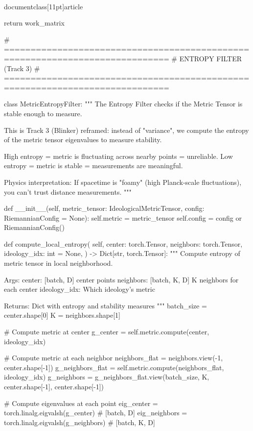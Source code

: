 \\documentclass[11pt]{article}
\begin{document}
\begin{CodeBlock}
        return work_matrix


# =============================================================================
# ENTROPY FILTER (Track 3)
# =============================================================================

class MetricEntropyFilter:
    """
    The Entropy Filter checks if the Metric Tensor is stable enough to measure.

    This is Track 3 (Blinker) reframed: instead of "variance", we compute
    the entropy of the metric tensor eigenvalues to measure stability.

    High entropy = metric is fluctuating across nearby points = unreliable.
    Low entropy = metric is stable = measurements are meaningful.

    Physics interpretation: If spacetime is "foamy" (high Planck-scale
    fluctuations), you can't trust distance measurements.
    """

    def __init__(self, metric_tensor: IdeologicalMetricTensor, config: RiemannianConfig = None):
        self.metric = metric_tensor
        self.config = config or RiemannianConfig()

    def compute_local_entropy(
        self,
        center: torch.Tensor,
        neighbors: torch.Tensor,
        ideology_idx: int = None,
    ) -> Dict[str, torch.Tensor]:
        """
        Compute entropy of metric tensor in local neighborhood.

        Args:
            center: [batch, D] center points
            neighbors: [batch, K, D] K neighbors for each center
            ideology_idx: Which ideology's metric

        Returns:
            Dict with entropy and stability measures
        """
        batch_size = center.shape[0]
        K = neighbors.shape[1]

        # Compute metric at center
        g_center = self.metric.compute(center, ideology_idx)

        # Compute metric at each neighbor
        neighbors_flat = neighbors.view(-1, center.shape[-1])
        g_neighbors_flat = self.metric.compute(neighbors_flat, ideology_idx)
        g_neighbors = g_neighbors_flat.view(batch_size, K, center.shape[-1], center.shape[-1])

        # Compute eigenvalues at each point
        eig_center = torch.linalg.eigvalsh(g_center)  # [batch, D]
        eig_neighbors = torch.linalg.eigvalsh(g_neighbors)  # [batch, K, D]


\end{CodeBlock}
\end{document}

